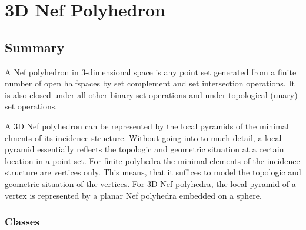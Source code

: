 
\clearpage
\chapter{3D Nef Polyhedron}
\label{chapterPolyhedronRef}

\section*{Summary}

A Nef polyhedron in 3-dimensional space is
any point set generated from a finite number of open halfspaces by set
complement and set intersection operations. It is also closed under 
all other binary set operations and under topological (unary) set operations. 

A 3D Nef polyhedron can be represented by the local pyramids of the minimal
elments of its incidence structure. Without going into to much detail, a local
pyramid essentially reflects the topologic and geometric situation at a certain
location in a point set. For finite polyhedra the minimal elements 
of the incidence structure are vertices only. This means, that it suffices to 
model the topologic and geometric situation of the vertices. For 
3D Nef polyhedra, the local pyramid of a vertex is represented by 
a planar Nef polyhedra embedded on a sphere.

\subsection*{Classes}

